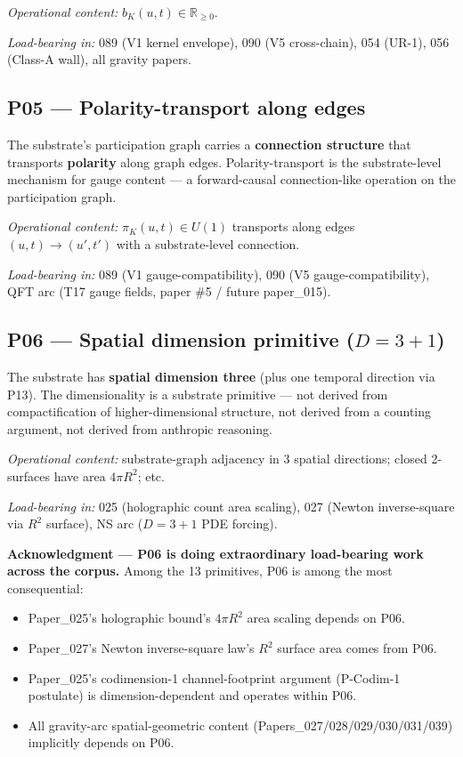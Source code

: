 \documentclass[11pt,a4paper]{article}
\begin{document}
\emph{Operational content:} $b_K(u, t) \in \mathbb{R}_{\geq 0}$.

\emph{Load-bearing in:} 089 (V1 kernel envelope), 090 (V5 cross-chain), 054 (UR-1), 056 (Class-A wall), all gravity papers.

\subsection*{P05 --- Polarity-transport along edges}

The substrate's participation graph carries a \textbf{connection structure} that transports \textbf{polarity} along graph edges. Polarity-transport is the substrate-level mechanism for gauge content --- a forward-causal connection-like operation on the participation graph.

\emph{Operational content:} $\pi_K(u, t) \in U(1)$ transports along edges $(u, t) \to (u', t')$ with a substrate-level connection.

\emph{Load-bearing in:} 089 (V1 gauge-compatibility), 090 (V5 gauge-compatibility), QFT arc (T17 gauge fields, paper \#5 / future paper\_015).

\subsection*{P06 --- Spatial dimension primitive ($D = 3+1$)}

The substrate has \textbf{spatial dimension three} (plus one temporal direction via P13). The dimensionality is a substrate primitive --- not derived from compactification of higher-dimensional structure, not derived from a counting argument, not derived from anthropic reasoning.

\emph{Operational content:} substrate-graph adjacency in 3 spatial directions; closed 2-surfaces have area $4\pi R^2$; etc.

\emph{Load-bearing in:} 025 (holographic count area scaling), 027 (Newton inverse-square via $R^2$ surface), NS arc ($D=3+1$ PDE forcing).

\textbf{Acknowledgment --- P06 is doing extraordinary load-bearing work across the corpus.} Among the 13 primitives, P06 is among the most consequential:

\begin{itemize}[noitemsep]
\item Paper\_025's holographic bound's $4\pi R^2$ area scaling depends on P06.
\item Paper\_027's Newton inverse-square law's $R^2$ surface area comes from P06.
\item Paper\_025's codimension-1 channel-footprint argument (P-Codim-1 postulate) is dimension-dependent and operates within P06.
\item All gravity-arc spatial-geometric content (Papers\_027/028/029/030/031/039) implicitly depends on P06.
\end{itemize}
\end{document}
